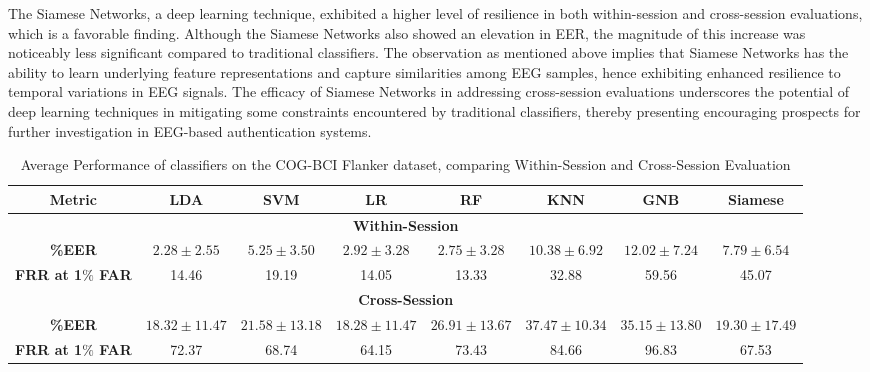 The Siamese Networks, a deep learning technique, exhibited a higher level of resilience in both within-session and cross-session evaluations, which is a favorable finding. Although the Siamese Networks also showed an elevation in EER, the magnitude of this increase was noticeably less significant compared to traditional classifiers. The observation as mentioned above implies that Siamese Networks has the ability to learn underlying feature representations  and capture similarities among EEG samples, hence exhibiting enhanced resilience to temporal variations in EEG signals. The efficacy of Siamese Networks in addressing cross-session evaluations underscores the potential of deep learning techniques in mitigating some constraints encountered by traditional classifiers, thereby presenting encouraging prospects for further investigation in EEG-based authentication systems.



 
    

\begin{table}[ht]
\caption{\large{Average Performance of classifiers on the COG-BCI Flanker \cite{cogbci} dataset, comparing Within-Session and Cross-Session Evaluation}}

\label{tab:Table 4}
\renewcommand\arraystretch{1.2}
\resizebox{\textwidth}{!}
    {
\begin{tabular}{c|ccccccc}

\hline

\rule{0pt}{25pt} \textbf{Metric} & \textbf{LDA} & \textbf{SVM} & \textbf{LR} & \textbf{RF} & \textbf{KNN} & \textbf{GNB} & \textbf{Siamese}\\

\hline
\multicolumn{8}{c}{\textbf{\cellcolor{lightgray}Within-Session}} \\
\hline
\rule{0pt}{25pt} \textbf{\%EER} & $2.28 \pm 2.55$ & $5.25 \pm 3.50$ & $2.92 \pm 3.28$ & $2.75 \pm 3.28$ & $10.38 \pm 6.92$ & $12.02 \pm 7.24$ & $7.79 \pm 6.54$	\\
\rule{0pt}{25pt} \textbf{FRR at 1$\%$ FAR} & 14.46 & 19.19 & 14.05 & 13.33 & 32.88 & 59.56 & 45.07 \\
\hline
\multicolumn{8}{c}{\textbf{\cellcolor{lightgray}Cross-Session}} \\
\hline
\rule{0pt}{25pt} \textbf{\%EER} & $18.32 \pm 11.47$ & $21.58 \pm 13.18$ & $18.28 \pm 11.47$ & $26.91 \pm 13.67$ & $37.47 \pm 10.34$ & $35.15 \pm 13.80$ & $19.30 \pm 17.49$	\\
\rule{0pt}{25pt} \textbf{FRR at 1$\%$ FAR} & 72.37 & 68.74 & 64.15 & 73.43 & 84.66 & 96.83 & 67.53 \\
\hline
\end{tabular}
}
\end{table}

